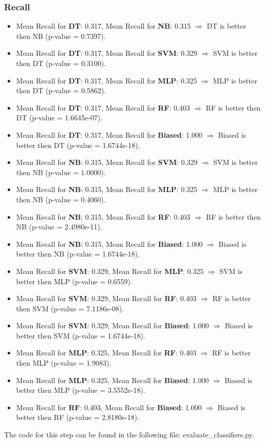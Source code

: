 \documentclass{article}
\begin{document}
\subsubsection{Recall}
\begin{itemize}
    \item Mean Recall for \textbf{DT}: 0.317, Mean Recall for \textbf{NB}: 0.315 $\Rightarrow$ DT is better then NB (p-value = 0.7397).
    \item Mean Recall for \textbf{DT}: 0.317, Mean Recall for \textbf{SVM}: 0.329 $\Rightarrow$ SVM is better then DT (p-value = 0.3100).
    \item Mean Recall for \textbf{DT}: 0.317, Mean Recall for \textbf{MLP}: 0.325 $\Rightarrow$ MLP is better then DT (p-value = 0.5862).
    \item Mean Recall for \textbf{DT}: 0.317, Mean Recall for \textbf{RF}: 0.403 $\Rightarrow$ RF is better then DT (p-value = 1.6645e-07).
    \item Mean Recall for \textbf{DT}: 0.317, Mean Recall for \textbf{Biased}: 1.000 $\Rightarrow$ Biased is better then DT (p-value = 1.6744e-18).
    \item Mean Recall for \textbf{NB}: 0.315, Mean Recall for \textbf{SVM}: 0.329 $\Rightarrow$ SVM is better then NB (p-value = 1.0000).
    \item Mean Recall for \textbf{NB}: 0.315, Mean Recall for \textbf{MLP}: 0.325 $\Rightarrow$ MLP is better then NB (p-value = 0.4060).
    \item Mean Recall for \textbf{NB}: 0.315, Mean Recall for \textbf{RF}: 0.403 $\Rightarrow$ RF is better then NB (p-value = 2.4980e-11).
    \item Mean Recall for \textbf{NB}: 0.315, Mean Recall for \textbf{Biased}: 1.000 $\Rightarrow$ Biased is better then NB (p-value = 1.6744e-18).
    \item Mean Recall for \textbf{SVM}: 0.329, Mean Recall for \textbf{MLP}: 0.325 $\Rightarrow$ SVM is better then MLP (p-value = 0.6559).
    \item Mean Recall for \textbf{SVM}: 0.329, Mean Recall for \textbf{RF}: 0.403 $\Rightarrow$ RF is better then SVM (p-value = 7.1186e-08).
    \item Mean Recall for \textbf{SVM}: 0.329, Mean Recall for \textbf{Biased}: 1.000 $\Rightarrow$ Biased is better then SVM (p-value = 1.6744e-18).
    \item Mean Recall for \textbf{MLP}: 0.325, Mean Recall for \textbf{RF}: 0.403 $\Rightarrow$ RF is better then MLP (p-value = 1.9083).
    \item Mean Recall for \textbf{MLP}: 0.325, Mean Recall for \textbf{Biased}: 1.000 $\Rightarrow$ Biased is better then MLP (p-value = 3.5552e-18).
    \item Mean Recall for \textbf{RF}: 0.403, Mean Recall for \textbf{Biased}: 1.000 $\Rightarrow$ Biased is better then RF (p-value = 2.8180e-18).
\end{itemize}
The code for this step can be found in the following file: evaluate\_classifiers.py.
\end{document}

